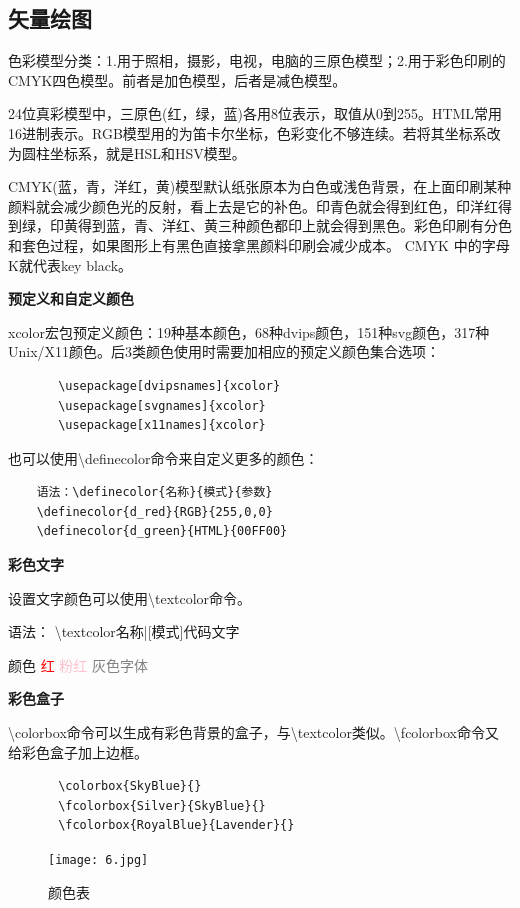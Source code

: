 \documentclass[16pt]{article}
\begin{document}
\subsection{矢量绘图}
   色彩模型分类：1.用于照相，摄影，电视，电脑的三原色模型；2.用于彩色印刷的CMYK四色模型。前者是加色模型，后者是减色模型。\par
   24位真彩模型中，三原色(红，绿，蓝)各用8位表示，取值从0到255。HTML常用16进制表示。RGB模型用的为笛卡尔坐标，色彩变化不够连续。若将其坐标系改为圆柱坐标系，就是HSL和HSV模型。\par
   CMYK(蓝，青，洋红，黄)模型默认纸张原本为白色或浅色背景，在上面印刷某种颜料就会减少颜色光的反射，看上去是它的补色。印青色就会得到红色，印洋红得到绿，印黄得到蓝，青、洋红、黄三种颜色都印上就会得到黑色。彩色印刷有分色和套色过程，如果图形上有黑色直接拿黑颜料印刷会减少成本。 CMYK 中的字母K就代表key black。 \par
   \textbf{预定义和自定义颜色} \par
   xcolor宏包预定义颜色：19种基本颜色，68种dvips颜色，151种svg颜色，317种Unix/X11颜色。后3类颜色使用时需要加相应的预定义颜色集合选项：\par
   \begin{lstlisting}
       \usepackage[dvipsnames]{xcolor}
       \usepackage[svgnames]{xcolor}
       \usepackage[x11names]{xcolor}
   \end{lstlisting} \par
   也可以使用\textbackslash definecolor命令来自定义更多的颜色： \par
   \begin{lstlisting}
    语法：\definecolor{名称}{模式}{参数} 
    \definecolor{d_red}{RGB}{255,0,0} 
    \definecolor{d_green}{HTML}{00FF00} 
   \end{lstlisting} \par
   \textbf{彩色文字} \par
   设置文字颜色可以使用\textbackslash textcolor命令。 \par
   语法： \textbackslash textcolor{名称}|[模式]{代码}{文字} \par
   \textcolor[RGB]{1,1,200}{颜色} \quad \textcolor{red}{红} \quad \textcolor{pink}{粉红} \quad \textcolor{gray}{灰色字体} \par
   \textbf{彩色盒子} \par
   \textbackslash colorbox命令可以生成有彩色背景的盒子，与\textbackslash textcolor类似。\textbackslash fcolorbox命令又给彩色盒子加上边框。 \par
   \begin{lstlisting}
       \colorbox{SkyBlue}{}
       \fcolorbox{Silver}{SkyBlue}{}
       \fcolorbox{RoyalBlue}{Lavender}{}
   \end{lstlisting}
   \colorbox{SkyBlue}{}
   \begin{figure}[htbp]
        \begin{minipage}{500pt}
            \centering
            \texttt{[image: 6.jpg]}
        \end{minipage}
       \caption{颜色表}
   \end{figure}
\end{document}
